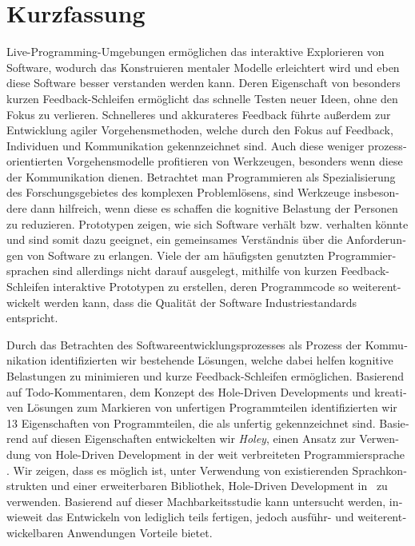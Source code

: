 \chapter{Kurzfassung}

\begin{german} %
    Live-Programming-Umgebungen ermöglichen das interaktive Explorieren von Software, wodurch das Konstruieren mentaler Modelle erleichtert wird und eben diese Software besser verstanden werden kann.
    Deren Eigenschaft von besonders kurzen Feedback-Schleifen ermöglicht das schnelle Testen neuer Ideen, ohne den Fokus zu verlieren.
    Schnelleres und akkurateres Feedback führte außerdem zur Entwicklung agiler Vorgehensmethoden, welche durch den Fokus auf Feedback, Individuen und Kommunikation gekennzeichnet sind.
    Auch diese weniger prozessorientierten Vorgehensmodelle profitieren von Werkzeugen, besonders wenn diese der Kommunikation dienen.
    Betrachtet man Programmieren als Spezialisierung des Forschungsgebietes des komplexen Problemlösens, sind Werkzeuge insbesondere dann hilfreich, wenn diese es schaffen die kognitive Belastung der Personen zu reduzieren.
    Prototypen zeigen, wie sich Software verhält bzw. verhalten könnte und sind somit dazu geeignet, ein gemeinsames Verständnis über die Anforderungen von Software zu erlangen.
    Viele der am häufigsten genutzten Programmiersprachen sind allerdings nicht darauf ausgelegt, mithilfe von kurzen Feedback-Schleifen interaktive Prototypen zu erstellen, deren Programmcode so weiterentwickelt werden kann, dass die Qualität der Software Industriestandards entspricht.

    Durch das Betrachten des Softwareentwicklungsprozesses als Prozess der Kommunikation identifizierten wir bestehende Lösungen, welche dabei helfen kognitive Belastungen zu minimieren und kurze Feedback-Schleifen ermöglichen.
    Basierend auf Todo-Kommentaren, dem Konzept des Hole-Driven Developments und kreativen Lösungen zum Markieren von unfertigen Programmteilen identifizierten wir 13 Eigenschaften von Programmteilen, die als unfertig gekennzeichnet sind.
    Basierend auf diesen Eigenschaften entwickelten wir \emph{Holey}, einen Ansatz zur Verwendung von Hole-Driven Development in der weit verbreiteten Programmiersprache \CS.
    Wir zeigen, dass es möglich ist, unter Verwendung von existierenden Sprachkonstrukten und einer erweiterbaren Bibliothek, Hole-Driven Development in \CS\ zu verwenden.
    Basierend auf dieser Machbarkeitsstudie kann untersucht werden, inwieweit das Entwickeln von lediglich teils fertigen, jedoch ausführ- und weiterentwickelbaren Anwendungen Vorteile bietet.
\end{german}